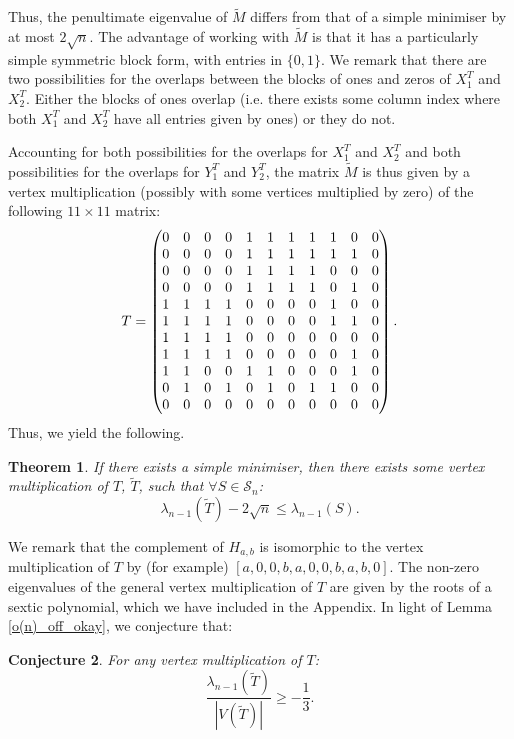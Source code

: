 \documentclass[12pt]{article}
\newtheorem{thm}{Theorem}[section]
\newtheorem{conj}[thm]{Conjecture}
\begin{document}
Thus, the penultimate eigenvalue of $\tilde{M}$ differs from that of a simple minimiser by at most $2\sqrt{n}$. The advantage of working with $\tilde{M}$ is that it has a particularly simple symmetric block form, with entries in $\{0,1\}$. We remark that there are two possibilities for the overlaps between the blocks of ones and zeros of $X_1^T$ and $X_2^T$. Either the blocks of ones overlap (i.e. there exists some column index where both $X_1^{T}$ and $X_2^{T}$ have all entries given by ones) or they do not.

Accounting for both possibilities for the overlaps for $X_1^{T}$ and $X_2^{T}$ and both possibilities for the overlaps for $Y_1^T$ and $Y_2^T$, the matrix $\tilde{M}$ is thus given by a vertex multiplication (possibly with some vertices multiplied by zero) of the following $11\times 11$ matrix:
\begin{equation*}
    \setcounter{MaxMatrixCols}{20}
    T = \begin{pmatrix}
        0&0&0&0&1&1&1&1&1&0&0 \\
        0&0&0&0&1&1&1&1&1&1&0 \\
        0&0&0&0&1&1&1&1&0&0&0 \\
        0&0&0&0&1&1&1&1&0&1&0 \\
        1&1&1&1&0&0&0&0&1&0&0 \\
        1&1&1&1&0&0&0&0&1&1&0 \\
        1&1&1&1&0&0&0&0&0&0&0 \\
        1&1&1&1&0&0&0&0&0&1&0 \\
        1&1&0&0&1&1&0&0&0&1&0 \\
        0&1&0&1&0&1&0&1&1&0&0 \\
        0&0&0&0&0&0&0&0&0&0&0
    \end{pmatrix}.
\end{equation*}
Thus, we yield the following.
\begin{thm} \label{2rootn_off} If there exists a simple minimiser, then there exists some vertex multiplication of $T$, $\tilde{T}$, such that $\forall S\in \mathcal{S}_n$:
\begin{equation*}
    \lambda_{n-1}(\tilde{T}) - 2\sqrt{n} \le \lambda_{n-1}(S).
\end{equation*}
\end{thm}
We remark that the complement of $H_{a,b}$ is isomorphic to the vertex multiplication of $T$ by (for example) $[a, 0,0,b,a,0,0,b,a,b,0]$. The non-zero eigenvalues of the general vertex multiplication of $T$ are given by the roots of a sextic polynomial, which we have included in the Appendix. In light of Lemma \ref{o(n)_off_okay}, we conjecture that:
\begin{conj} For any vertex multiplication of $T$:
\begin{equation*}
    \frac{\lambda_{n-1}(\tilde{T})}{|V(\tilde{T})|} \ge -\frac{1}{3}.
\end{equation*}
\end{conj}
\end{document}
